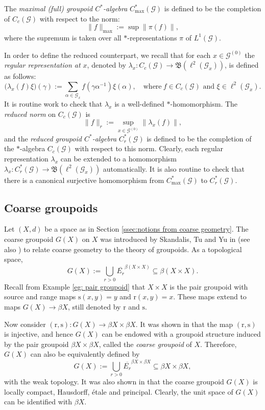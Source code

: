 \documentclass[12pt, a4paper]{amsart}
\numberwithin{equation}{section}
\theoremstyle{definition}
\theoremstyle{remark}
\def\G{\mathcal{G}}
\def\Gz{\mathcal{G}^{(0)}}
\def\B{\mathfrak{B}}
\def\max{\mathrm{max}}
\def\r{\mathrm{r}}
\def\s{\mathrm{s}}
\begin{document}
The \emph{maximal (full) groupoid $C^*$-algebra} $C^*_{\max}(\G)$ is defined to be the completion of $C_c(\G)$ with respect to the norm:
\[
\|f\|_{\max}:=\sup \|\pi(f)\|,
\]
where the supremum is taken over all $\ast$-representations $\pi$ of $L^1(\G)$.


In order to define the reduced counterpart, we recall that for each $x \in \Gz$ the \emph{regular representation at $x$}, denoted by $\lambda_x: C_c(\G) \to \B(\ell^2(\G_x))$, is defined as follows:
\begin{equation}\label{reduced algebra defn}
\big(\lambda_x(f)\xi\big)(\gamma):=\sum_{\alpha \in \G_x} f(\gamma \alpha^{-1})\xi(\alpha), \quad \mbox{where}~ f \in C_c(\G)\mbox{~and~}\xi \in \ell^2(\G_x).
\end{equation}
It is routine work to check that $\lambda_x$ is a well-defined $\ast$-homomorphism. The \emph{reduced norm} on $C_c(\G)$ is
\[
\|f\|_r:=\sup_{x \in \Gz} \|\lambda_x(f)\|,
\]
and the \emph{reduced groupoid $C^*$-algebra} $C^*_r(\G)$ is defined to be the completion of the $\ast$-algebra $C_c(\G)$ with respect to this norm. Clearly, each regular representation $\lambda_x$ can be extended to a homomorphism $\lambda_x: C^*_r(\G) \to \B(\ell^2(\G_x))$ automatically. It is also routine to check that there is a canonical surjective homomorphism from $C^*_{\max}(\G)$ to $C^*_r(\G)$.


\subsection{Coarse groupoids} \label{ssec:coarse groupoid}
Let $(X,d)$ be a space as in Section \ref{ssec:notions from coarse geometry}. The coarse groupoid $G(X)$ on $X$ was introduced by Skandalis, Tu and Yu in \cite{STY02} (see also \cite[Chapter 10]{Roe03}) to relate coarse geometry to the theory of
groupoids. As a topological space,
\[
G(X):=\bigcup_{r>0}{\overline{E_r}}^{\beta (X \times X)} \subseteq \beta (X \times X).
\]
Recall from Example \ref{eg: pair groupoid} that $X \times X$ is the pair groupoid with source and range maps $\s(x,y)=y$ and $\r(x,y)=x$. These maps extend to maps $G(X) \to \beta X$, still denoted by $\r$ and $\s$.

Now consider $(\r,\s): G(X) \to \beta X \times \beta X$. It was shown in \cite[Lemma 2.7]{STY02} that the map $(\r,\s)$ is injective, and hence $G(X)$ can be endowed with a groupoid structure induced by the pair groupoid $\beta X \times \beta X$, called the \emph{coarse groupoid} of $X$. Therefore, $G(X)$ can also be equivalently defined by
\[
G(X):=\bigcup_{r>0}{\overline{E_r}}^{\beta X \times \beta X} \subseteq \beta X \times \beta X,
\]
with the weak topology. It was also shown in \cite[Proposition 3.2]{STY02} that the coarse groupoid $G(X)$ is locally compact, Hausdorff, \'{e}tale and principal. Clearly, the unit space of $G(X)$ can be identified with $\beta X$. 
\end{document}
